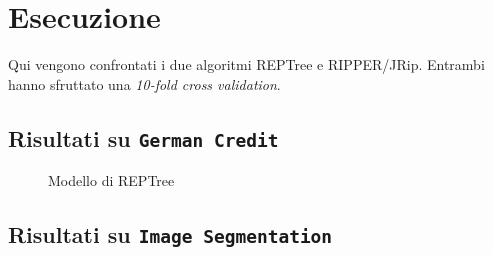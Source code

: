 \chapter{Esecuzione}
\label{ch:results}
Qui vengono confrontati i due algoritmi REPTree e RIPPER/JRip. Entrambi hanno sfruttato una \textit{10-fold cross validation}.

\section{Risultati su \texttt{German Credit}}

\begin{mdframed}[frametitle=Esecuzione REPTree]
	\footnotesize
\end{mdframed}

\begin{figure}
	\caption{Modello di REPTree}
\end{figure}

\pagebreak

\begin{mdframed}[frametitle=Esecuzione JRip]
	\footnotesize
\end{mdframed}

\vspace{-2em}
\begin{mdframed}[frametitle=Regole]
	\begin{adjustwidth}{.25\linewidth}{}
	\end{adjustwidth}
\end{mdframed}



\pagebreak

\section{Risultati su \texttt{Image Segmentation}}

